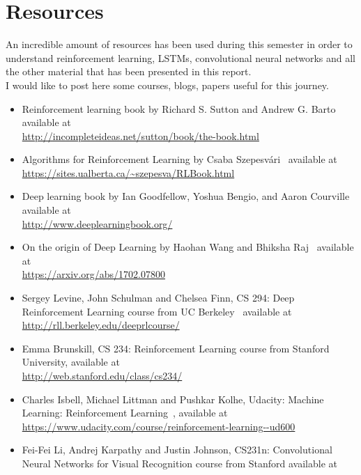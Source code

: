 \chapter{Resources}
\label{chapter6}

\vspace{0.5cm}

\noindent An incredible amount of resources has been used during this semester in order to understand reinforcement learning, LSTMs, convolutional neural networks and all the other material that has been presented in this report. \\
I would like to post here some courses, blogs, papers useful for this journey.

\noindent
\begin{itemize}
\item Reinforcement learning book by  Richard S. Sutton and Andrew G. Barto~\cite{SuttonBook} available at \\ \url{http://incompleteideas.net/sutton/book/the-book.html}
\item Algorithms for Reinforcement Learning by Csaba Szepesv{\'a}ri~\cite{RLAlgs} available at \\
\url{https://sites.ualberta.ca/~szepesva/RLBook.html}
\item Deep learning book by Ian Goodfellow, Yoshua Bengio, and Aaron Courville~\cite{Goodfellow-et-al-2016} available at \\
\url{http://www.deeplearningbook.org/}
\item On the origin of Deep Learning by Haohan Wang and Bhiksha Raj~\cite{origin-dl} available at \\
\url{https://arxiv.org/abs/1702.07800}
\item Sergey Levine, John Schulman and Chelsea Finn, CS 294: Deep Reinforcement Learning course from UC Berkeley~\cite{DeepRLCourse} available at \\
\url{http://rll.berkeley.edu/deeprlcourse/}
\item Emma Brunskill, CS 234: Reinforcement Learning course from Stanford University, available at \\
\url{http://web.stanford.edu/class/cs234/}
\item Charles Isbell, Michael Littman and Pushkar Kolhe, Udacity: Machine Learning: Reinforcement Learning~\cite{RLUdacity}, available at \\
\url{https://www.udacity.com/course/reinforcement-learning--ud600}
\item Fei-Fei Li, Andrej Karpathy and Justin Johnson, CS231n: Convolutional Neural Networks for Visual Recognition course from Stanford available at \\

\end{itemize}
